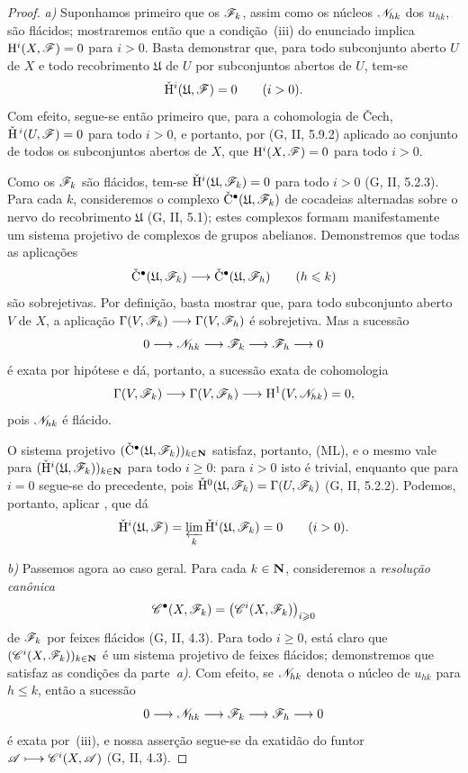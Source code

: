 \begin{proof}
\emph{a)}
Suponhamos primeiro que os $\mathscr{F}_k$, assim como os núcleos
$\mathscr{N}_{hk}$ dos $u_{hk}$, são flácidos; mostraremos então que
a condição~{\rm(iii)} do enunciado implica
$\mathrm{H}^i(X,\mathscr{F})=0$ para $i>0$.
Basta demonstrar que, para todo subconjunto aberto $U$ de $X$ e todo
recobrimento $\mathfrak{U}$ de $U$ por subconjuntos abertos de $U$, tem-se
\[
  \check{\mathrm{H}}^i(\mathfrak{U},\mathscr{F})=0
  \qquad (i>0).
\]
Com efeito, segue-se então primeiro que, para a cohomologia de \v{C}ech,
$\check{\mathrm{H}}^{\,i}(U,\mathscr{F})=0$ para todo $i>0$, e portanto, por
(G, II, 5.9.2) aplicado ao conjunto de todos os subconjuntos abertos de
$X$, que $\mathrm{H}^i(X,\mathscr{F})=0$ para todo $i>0$.

Como os $\mathscr{F}_k$ são flácidos, tem-se
$\check{\mathrm{H}}^i(\mathfrak{U},\mathscr{F}_k)=0$ para todo $i>0$
(G, II, 5.2.3).
Para cada $k$, consideremos o complexo
$\check{\mathrm{C}}^\bullet(\mathfrak{U},\mathscr{F}_k)$ de cocadeias
alternadas sobre o nervo do recobrimento $\mathfrak{U}$ (G, II, 5.1);
estes complexos formam manifestamente um sistema projetivo de complexos de
grupos abelianos.
Demonstremos que todas as aplicações
\[
  \check{\mathrm{C}}^\bullet(\mathfrak{U},\mathscr{F}_k)
  \longrightarrow
  \check{\mathrm{C}}^\bullet(\mathfrak{U},\mathscr{F}_h)
  \qquad(h\leqslant k)
\]
são sobrejetivas.
Por definição, basta mostrar que, para todo subconjunto aberto $V$
de $X$, a aplicação
$\Gamma(V,\mathscr{F}_k)\longrightarrow\Gamma(V,\mathscr{F}_h)$ é
  sobrejetiva. Mas a sucessão
\[
  0\longrightarrow\mathscr{N}_{hk}\longrightarrow\mathscr{F}_k
  \longrightarrow\mathscr{F}_h\longrightarrow0
\]
é exata por hipótese e dá, portanto, a sucessão exata de
cohomologia
\[
  \Gamma(V,\mathscr{F}_k)\longrightarrow\Gamma(V,\mathscr{F}_h)
  \longrightarrow\mathrm{H}^1(V,\mathscr{N}_{hk})=0,
\]
pois $\mathscr{N}_{hk}$ é flácido.

O sistema projetivo
$(\check{\mathrm{C}}^\bullet(\mathfrak{U},\mathscr{F}_k))_{k\in\mathbf{N}}$
satisfaz, portanto, (ML), e o mesmo vale para
$(\check{\mathrm{H}}^i(\mathfrak{U},\mathscr{F}_k))_{k\in\mathbf{N}}$ para todo $i\geq0$:
para $i>0$ isto é trivial, enquanto que para $i=0$ segue-se do
precedente, pois
$\check{\mathrm{H}}^0(\mathfrak{U},\mathscr{F}_k)=\Gamma(U,\mathscr{F}_k)$
(G, II, 5.2.2).
Podemos, portanto, aplicar , que dá
\[
  \check{\mathrm{H}}^i(\mathfrak{U},\mathscr{F})
  =
  \varprojlim_k\check{\mathrm{H}}^i(\mathfrak{U},\mathscr{F}_k)
  =0
  \qquad(i>0).
\]

\emph{b)}
Passemos agora ao caso geral. Para cada $k\in\mathbf{N}$, consideremos a
\emph{resolução canônica}
\[
  \mathscr{C}^\bullet(X,\mathscr{F}_k)
  =
  \bigl(\mathscr{C}^i(X,\mathscr{F}_k)\bigr)_{i\geqslant0}
\]
de $\mathscr{F}_k$ por feixes flácidos (G, II, 4.3).
Para todo $i\geq0$, está claro que
$(\mathscr{C}^i(X,\mathscr{F}_k))_{k\in\mathbf{N}}$ é um sistema projetivo de
feixes flácidos; demonstremos que satisfaz as condições da
parte~\emph{a)}.
Com efeito, se $\mathscr{N}_{hk}$ denota o núcleo de $u_{hk}$ para $h\leq k$,
então a sucessão
\[
  0\longrightarrow\mathscr{N}_{hk}\longrightarrow\mathscr{F}_k
  \longrightarrow\mathscr{F}_h\longrightarrow0
\]
é exata por~{\rm(iii)}, e nossa asserção segue-se da exatidão
do funtor
$\mathscr{A}\longmapsto\mathscr{C}^i(X,\mathscr{A})$ (G, II, 4.3).


\end{proof}
